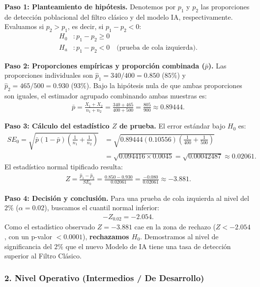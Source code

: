 \begin{solproblema}
	\textbf{Paso 1: Planteamiento de hipótesis.}
	Denotemos por $p_1$ y $p_2$ las proporciones de detección poblacional del filtro clásico y del modelo IA, respectivamente. Evaluamos si $p_2 > p_1$, es decir, si $p_1 - p_2 < 0$:
	\begin{align}
		H_0&: p_1 - p_2 \geq 0 \\
		H_a&: p_1 - p_2 < 0 \quad \text{(prueba de cola izquierda)}.
	\end{align}
	
	\textbf{Paso 2: Proporciones empíricas y proporción combinada ($\bar{p}$).}
	Las proporciones individuales son $\hat{p}_1 = 340/400 = 0.850$ ($85\%$) y $\hat{p}_2 = 465/500 = 0.930$ ($93\%$).
	Bajo la hipótesis nula de que ambas proporciones son iguales, el estimador agrupado combinando ambas muestras es:
	\begin{align}
		\bar{p} = \frac{X_1 + X_2}{n_1 + n_2} = \frac{340 + 465}{400 + 500} = \frac{805}{900} \approx 0.89444.
	\end{align}
	
	\textbf{Paso 3: Cálculo del estadístico $Z$ de prueba.}
	El error estándar bajo $H_0$ es:
	\begin{align}
		SE_0 = \sqrt{\bar{p}(1-\bar{p})\left(\frac{1}{n_1} + \frac{1}{n_2}\right)} &= \sqrt{0.89444(0.10556)\left(\frac{1}{400} + \frac{1}{500}\right)} \\
		&= \sqrt{0.094416 \times 0.0045} = \sqrt{0.00042487} \approx 0.02061.
	\end{align}
	El estadístico normal tipificado resulta:
	\begin{align}
		Z = \frac{\hat{p}_1 - \hat{p}_2}{SE_0} = \frac{0.850 - 0.930}{0.02061} = \frac{-0.080}{0.02061} \approx -3.881.
	\end{align}
	
	\textbf{Paso 4: Decisión y conclusión.}
	Para una prueba de cola izquierda al nivel del $2\%$ ($\alpha = 0.02$), buscamos el cuantil normal inferior:
	\begin{align}
		-Z_{0.02} = -2.054.
	\end{align}
	Como el estadístico observado $Z = -3.881$ cae en la zona de rechazo ($Z < -2.054$, con un p-valor $< 0.0001$), \textbf{rechazamos $H_0$}. Demostramos al nivel de significancia del $2\%$ que el nuevo Modelo de IA tiene una tasa de detección superior al Filtro Clásico.
\end{solproblema}

\subsubsection*{2. Nivel Operativo (Intermedios / De Desarrollo)}

